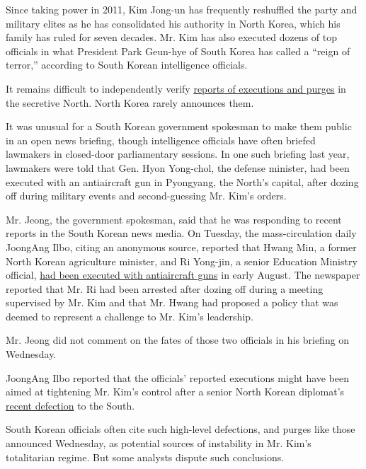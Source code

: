 Since taking power in 2011, Kim Jong-un has frequently reshuffled the
party and military elites as he has consolidated his authority in North
Korea, which his family has ruled for seven decades. Mr. Kim has also
executed dozens of top officials in what President Park Geun-hye of
South Korea has called a ``reign of terror,'' according to South Korean
intelligence officials.

It remains difficult to independently verify
\href{http://thelede.blogs.nytimes.com/2014/01/03/inside-the-tale-of-north-korea-execution-by-ravenous-dog/}{reports
of executions and purges} in the secretive North. North Korea rarely
announces them.

It was unusual for a South Korean government spokesman to make them
public in an open news briefing, though intelligence officials have
often briefed lawmakers in closed-door parliamentary sessions. In one
such briefing last year, lawmakers were told that Gen. Hyon Yong-chol,
the defense minister, had been executed with an antiaircraft gun in
Pyongyang, the North's capital, after dozing off during military events
and second-guessing Mr. Kim's orders.

Mr. Jeong, the government spokesman, said that he was responding to
recent reports in the South Korean news media. On Tuesday, the
mass-circulation daily JoongAng Ilbo, citing an anonymous source,
reported that Hwang Min, a former North Korean agriculture minister, and
Ri Yong-jin, a senior Education Ministry official,
\href{http://www.bloomberg.com/news/articles/2016-08-30/kim-has-two-officials-killed-by-anti-aircraft-gun-joongang-says}{had
been executed with antiaircraft guns} in early August. The newspaper
reported that Mr. Ri had been arrested after dozing off during a meeting
supervised by Mr. Kim and that Mr. Hwang had proposed a policy that was
deemed to represent a challenge to Mr. Kim's leadership.

Mr. Jeong did not comment on the fates of those two officials in his
briefing on Wednesday.

JoongAng Ilbo reported that the officials' reported executions might
have been aimed at tightening Mr. Kim's control after a senior North
Korean diplomat's
\href{http://www.nytimes.com/2016/08/18/world/asia/north-korea-defector-thae-yong-ho-britain.html}{recent
defection} to the South.

South Korean officials often cite such high-level defections, and purges
like those announced Wednesday, as potential sources of instability in
Mr. Kim's totalitarian regime. But some analysts dispute such
conclusions.

